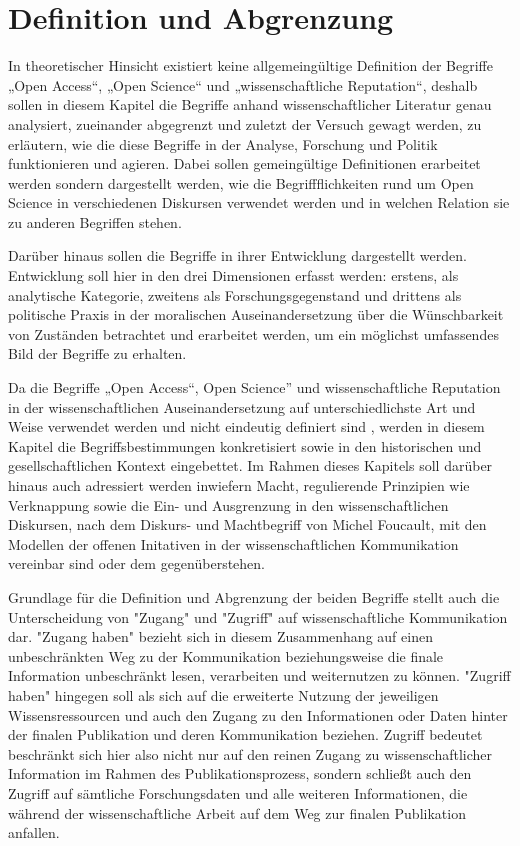 \chapter{Definition und Abgrenzung} 
In theoretischer Hinsicht existiert keine allgemeingültige Definition der Begriffe „Open Access“, „Open Science“ und „wissenschaftliche Reputation“, deshalb sollen in diesem Kapitel die Begriffe anhand wissenschaftlicher Literatur genau analysiert, zueinander abgegrenzt und zuletzt der Versuch gewagt werden, zu erläutern, wie die diese Begriffe in der Analyse, Forschung und Politik funktionieren und agieren. Dabei sollen gemeingültige Definitionen erarbeitet werden sondern dargestellt werden, wie die Begriffflichkeiten rund um Open Science in verschiedenen Diskursen verwendet werden und in welchen Relation sie zu anderen Begriffen stehen.

Darüber hinaus sollen die Begriffe in ihrer Entwicklung dargestellt werden. Entwicklung soll hier in den drei Dimensionen erfasst werden: erstens, als analytische Kategorie, zweitens als Forschungsgegenstand und drittens als politische Praxis in der moralischen Auseinandersetzung über die Wünschbarkeit von Zuständen betrachtet und erarbeitet werden, um ein möglichst umfassendes Bild der Begriffe zu erhalten. \cite{cite:10}

Da die Begriffe „Open Access“, Open Science” und wissenschaftliche Reputation in der wissenschaftlichen Auseinandersetzung auf unterschiedlichste Art und Weise verwendet werden und nicht eindeutig definiert sind \cite{cite:9}, werden in diesem Kapitel die Begriffsbestimmungen konkretisiert sowie in den historischen und gesellschaftlichen Kontext eingebettet.
Im Rahmen dieses Kapitels soll darüber hinaus auch adressiert werden inwiefern Macht, regulierende Prinzipien wie Verknappung sowie die Ein- und Ausgrenzung in den wissenschaftlichen Diskursen, nach dem Diskurs- und Machtbegriff  von Michel Foucault, mit den Modellen der offenen Initativen in der wissenschaftlichen Kommunikation vereinbar sind oder dem gegenüberstehen.

Grundlage für die Definition und Abgrenzung der beiden Begriffe stellt auch die Unterscheidung von "Zugang" und "Zugriff" auf wissenschaftliche Kommunikation dar. "Zugang haben" bezieht sich in diesem Zusammenhang auf einen unbeschränkten Weg zu der Kommunikation beziehungsweise die finale Information unbeschränkt lesen\cite{cite:9a}, verarbeiten und weiternutzen zu können. "Zugriff haben" hingegen soll als sich auf die erweiterte Nutzung der jeweiligen Wissensressourcen und auch den Zugang zu den Informationen oder Daten hinter der finalen Publikation und deren Kommunikation beziehen\cite{cite:9b}. Zugriff bedeutet beschränkt sich hier also nicht nur auf den reinen Zugang zu wissenschaftlicher Information im Rahmen des Publikationsprozess, sondern schließt auch den Zugriff auf sämtliche Forschungsdaten und alle weiteren Informationen, die während der wissenschaftliche Arbeit auf dem Weg zur finalen Publikation anfallen\cite{cite:9c}.